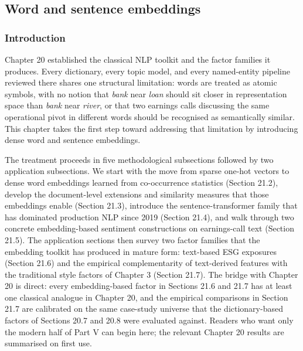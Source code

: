 \subsection{Word and sentence embeddings}

% 
%

\subsubsection{Introduction}

Chapter 20 established the classical NLP toolkit and the factor families it produces. Every dictionary, every topic model, and every named-entity pipeline reviewed there shares one structural limitation: words are treated as atomic symbols, with no notion that \textit{bank} near \textit{loan} should sit closer in representation space than \textit{bank} near \textit{river}, or that two earnings calls discussing the same operational pivot in different words should be recognised as semantically similar. This chapter takes the first step toward addressing that limitation by introducing dense word and sentence embeddings.

The treatment proceeds in five methodological subsections followed by two application subsections. We start with the move from sparse one-hot vectors to dense word embeddings learned from co-occurrence statistics (Section 21.2), develop the document-level extensions and similarity measures that those embeddings enable (Section 21.3), introduce the sentence-transformer family that has dominated production NLP since 2019 (Section 21.4), and walk through two concrete embedding-based sentiment constructions on earnings-call text (Section 21.5). The application sections then survey two factor families that the embedding toolkit has produced in mature form: text-based ESG exposures (Section 21.6) and the empirical complementarity of text-derived features with the traditional style factors of Chapter 3 (Section 21.7).
The bridge with Chapter 20 is direct: every embedding-based factor in Sections 21.6 and 21.7 has at least one classical analogue in Chapter 20, and the empirical comparisons in Section 21.7 are calibrated on the same case-study universe that the dictionary-based factors of Sections 20.7 and 20.8 were evaluated against. Readers who want only the modern half of Part V can begin here; the relevant Chapter 20 results are summarised on first use.

